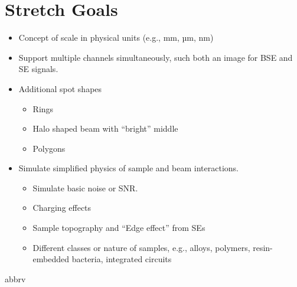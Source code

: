 \documentclass{article}
\begin{document}
\section{Stretch Goals}
\begin{itemize}
  \item Concept of scale in physical units (e.g., mm, µm, nm)
  \item Support multiple channels simultaneously, such both an image for BSE
  and SE signals.
  \item Additional spot shapes
  \begin{itemize}
  \item Rings
  \item Halo shaped beam with “bright” middle
  \item Polygons
  \end{itemize}
  \item Simulate simplified physics of sample and beam interactions.
  \begin{itemize}
  \item Simulate basic noise or SNR.
  \item Charging effects
  \item Sample topography and “Edge effect” from SEs
  \item Different classes or nature of samples, e.g., alloys, polymers,
  resin-embedded bacteria, integrated circuits
  \end{itemize}
\end{itemize}

 {abbrv}

\end{document}
